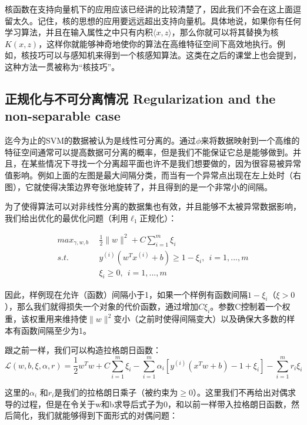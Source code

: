 \documentclass[UTF8]{ctexart}
\begin{document}
核函数在支持向量机下的应用应该已经讲的比较清楚了，因此我们不会在这上面逗留太久。记住，核的思想的应用要远远超出支持向量机。具体地说，如果你有任何学习算法，并且在输入属性之中只有内积$\langle x,z \rangle$，那么你就可以将其替换为核$K(x,z)$，这样你就能够神奇地使你的算法在高维特征空间下高效地执行。例如，核技巧可以与感知机来得到一个核感知算法。这类在之后的课堂上也会提到，这种方法一贯被称为“核技巧”。



\subsection{正规化与不可分离情况 Regularization and the non-separable case}


\begin{figure}[htb]        
\end{figure}


迄今为止的SVM的数据被认为是线性可分离的。通过$\phi$来将数据映射到一个高维的特征空间通常可以提高数据可分离的概率，但是我们不能保证它总是能够做到。并且，在某些情况下寻找一个分离超平面也许不是我们想要做的，因为很容易被异常值影响。例如上面的左图是最大间隔分类，而当有一个异常点出现在左上处时（右图），它就使得决策边界夸张地旋转了，并且得到的是一个非常小的间隔。


为了使得算法可以对非线性分离的数据集也有效，并且能够不太被异常数据影响，我们给出优化的最优化问题（利用$\ell_{1}$正规化）：


\begin{align*}
max_{\gamma,w,b} & \ \ \frac{1}{2} \|w\|^{2} + C \sum_{i=1}^{m}\xi_{i} \\
s.t. & \ \   y^{(i)}(w^{T}x^{(i)}+b)   \geq   1-\xi_{i},\ \ i=1,...,m \\
& \ \ \xi_{i} \geq 0,\ \ i=1,...,m
\end{align*}


因此，样例现在允许（函数）间隔小于1，如果一个样例有函数间隔$1-\xi_{i}$（$\xi > 0 $），那么我们就得损失一个对象的代价函数，通过增加$C\xi_{i}$。参数C控制着一个权重，该权重用来维持使$\|w\|^{2}$变小（之前时使得间隔变大）以及确保大多数的样本有函数间隔至少为1。


跟之前一样，我们可以构造拉格朗日函数：\[\mathcal{L} (w,b,\xi,\alpha,r) = \frac{1}{2} w^{T}w + C \sum_{i=1}^{m}\xi_{i} - 
\sum_{i=1}^{m} \alpha_{i} [ y^{(i)}(x^{T}w+b) -1 +  \xi_{i}  ] - \sum_{i=1}^{m}r_{i}\xi_{i}
 \]

这里的$\alpha_{i}$ 和$ r_{i}$是我们的拉格朗日乘子（被约束为$\geq 0 $）。这里我们不再给出对偶求导的过程，但是在令关于w和b求导后式子为0，和以前一样带入拉格朗日函数，然后简化，我们就能够得到下面形式的对偶问题：
\end{document}
